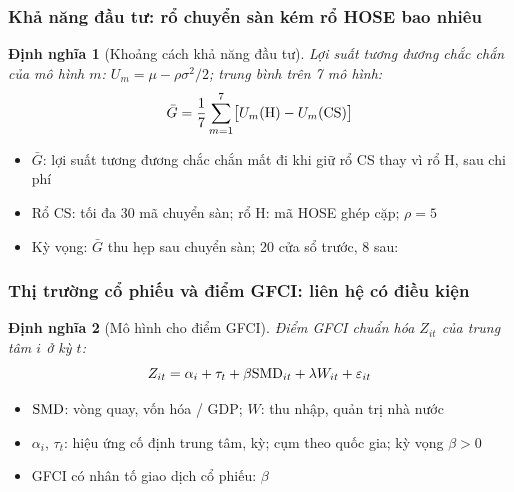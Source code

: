 \documentclass[11pt, xcolor={dvipsnames}, aspectratio=169, usepdftitle=false]{beamer}
\newtheorem{dinhnghia}{Định nghĩa} %
\newcommand{\vn}[1]{\text{\normalfont #1}}
\newcommand{\SMD}{\vn{SMD}}
\begin{document}
\begin{frame}
\end{frame}

\begin{frame}[label=khaNang]
\frametitle{Khả năng đầu tư: rổ chuyển sàn kém rổ HOSE bao nhiêu}
\begin{dinhnghia}[Khoảng cách khả năng đầu tư]
Lợi suất tương đương chắc chắn của mô hình $m$: $U_m = \mu - \rho\sigma^2/2$; trung bình trên 7 mô hình:
\[
\bar{G} = \frac{1}{7}\sum_{m=1}^{7} \bigl[U_m(\vn{H}) - U_m(\vn{CS})\bigr]
\]
\end{dinhnghia}
\begin{itemize}
\item $\bar{G}$: lợi suất tương đương chắc chắn mất đi khi giữ rổ CS thay vì rổ H, sau chi phí
\item Rổ CS: tối đa 30 mã chuyển sàn; rổ H: mã HOSE ghép cặp; $\rho = 5$
\item Kỳ vọng: $\bar{G}$ thu hẹp sau chuyển sàn; 20 cửa sổ trước, 8 sau: 
\end{itemize}
\end{frame}

\begin{frame}
\frametitle{Thị trường cổ phiếu và điểm GFCI: liên hệ có điều kiện}
\begin{dinhnghia}[Mô hình cho điểm GFCI]
Điểm GFCI chuẩn hóa $Z_{it}$ của trung tâm $i$ ở kỳ $t$:
\[
Z_{it} = \alpha_i + \tau_t + \beta \SMD_{it} + \lambda W_{it} + \varepsilon_{it}
\]
\end{dinhnghia}
\begin{itemize}
\item $\SMD$: vòng quay, vốn hóa / GDP; $W$: thu nhập, quản trị nhà nước
\item $\alpha_i$, $\tau_t$: hiệu ứng cố định trung tâm, kỳ; cụm theo quốc gia; kỳ vọng $\beta > 0$
\item GFCI có nhân tố giao dịch cổ phiếu: $\beta$ 
\end{itemize}
\end{frame}

\begin{frame}
\end{frame}
\end{document}
